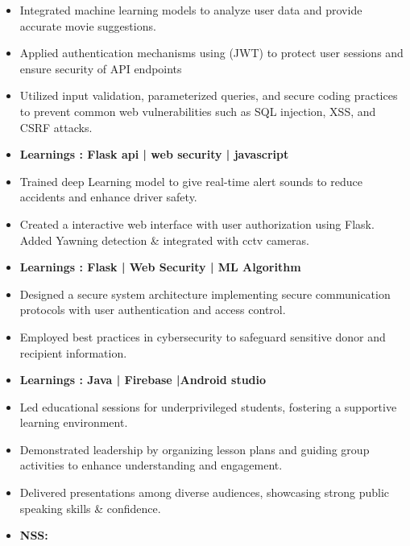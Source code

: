 


\begin{itemize}
\item Integrated machine learning models to analyze user data and provide accurate movie suggestions.
\item Applied authentication mechanisms using (JWT) to protect user sessions and ensure security of API endpoints
\item Utilized input validation, parameterized queries, and secure coding practices to prevent common web vulnerabilities such as SQL injection, XSS, and CSRF attacks.
\item\bf{Learnings }{: Flask api | web security | javascript }
\end{itemize}
\smallskip
{}
\begin{itemize}
\item Trained deep Learning model to give real-time alert sounds to reduce accidents and enhance driver safety.
\item Created a interactive web interface with user authorization using Flask. Added Yawning detection \& integrated with cctv cameras.
\item\bf{Learnings }{: Flask | Web Security | ML Algorithm}
\end{itemize}
\smallskip
{}
\begin{itemize}
\item Designed a secure system architecture implementing secure communication protocols with user authentication and access control.
\item Employed best practices in cybersecurity to safeguard sensitive donor and recipient information.
\item\bf{Learnings }{: Java | Firebase |Android studio }
\end{itemize}



\begin{itemize}
    \item  \normalfont Led educational sessions for underprivileged students, fostering a supportive learning environment.
    \item Demonstrated leadership by organizing lesson plans and guiding group activities to enhance understanding and engagement.
\item Delivered presentations among diverse audiences, showcasing strong public speaking skills \& confidence.
\item \bf{NSS:}
\end{itemize}


